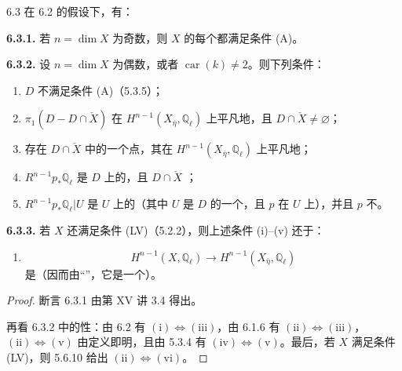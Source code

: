 \begin{SGAresult}{}{6.3}
在 6.2 的假设下，有：

\textbf{6.3.1.} 若 $n=\dim X$ 为奇数，则 $X$ 的每个都满足条件 (A)。

\textbf{6.3.2.} 设 $n=\dim X$ 为偶数，或者 $\operatorname{car}(k)\neq2$。则下列条件：
\begin{enumerate}
\item[(i)] $D$ 不满足条件 (A)（5.3.5）；
\item[(ii)] $\pi_1(D-D\cap\check X)$ 在 $H^{n-1}(X_{\bar\eta},\mathbb Q_\ell)$ 上平凡地，且 $D\cap\check X\neq\varnothing$；
\item[(iii)] 存在 $D\cap\check X$ 中的一个点，其在 $H^{n-1}(X_{\bar\eta},\mathbb Q_\ell)$ 上平凡地；
\item[(iv)]  $R^{n-1}p_*\mathbb Q_\ell$ 是 $D$ 上的，且 $D\cap\check X$ ；
\item[(v)]  $R^{n-1}p_*\mathbb Q_\ell|U$ 是 $U$ 上的（其中 $U$ 是 $D$ 的一个，且 $p$ 在 $U$ 上），并且 $p$ 不。
\end{enumerate}
\textbf{6.3.3.} 若 $X$ 还满足条件 (LV)（5.2.2），则上述条件 (i)--(v) 还于：
\begin{enumerate}
\item[(vi)] 
\[
H^{n-1}(X,\mathbb Q_\ell)\longrightarrow H^{n-1}(X_{\bar\eta},\mathbb Q_\ell)
\]
是（因而由“”，它是一个）。
\end{enumerate}
\end{SGAresult}
\begin{proof}
断言 6.3.1 由第 XV 讲 3.4 得出。

再看 6.3.2 中的性：由 6.2 有 $(\mathrm{i})\Longleftrightarrow(\mathrm{iii})$，由 6.1.6 有 $(\mathrm{ii})\Longleftrightarrow(\mathrm{iii})$，$(\mathrm{ii})\Longleftrightarrow(\mathrm{v})$ 由定义即明，且由 5.3.4 有 $(\mathrm{iv})\Longleftrightarrow(\mathrm{v})$。最后，若 $X$ 满足条件 (LV)，则 5.6.10 给出 $(\mathrm{ii})\Longleftrightarrow(\mathrm{vi})$。
\end{proof}

